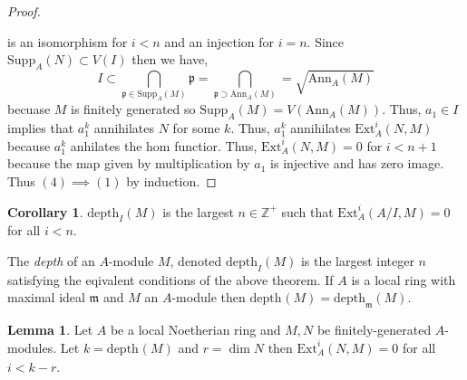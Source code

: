 \documentclass[12pt]{article}
\newcommand{\Z}{\mathbb{Z}}
\newcommand{\Ext}[4]{\mathrm{Ext}^{#1}_{#2} \left( #3, #4 \right)}
\newcommand{\Ann}[2]{\mathrm{Ann}_{#1}\left(#2\right)}
\newcommand{\supp}[2]{\mathrm{Supp}_{#1} \left( #2 \right) }
\newcommand{\Supp}[2]{\mathrm{Supp}_{#1}\left( #2 \right)}
\newcommand{\depth}[2]{\mathrm{depth}_{#1}\left(#2\right)}
\newcommand{\p}{\mathfrak{p}}
\newcommand{\m}{\mathfrak{m}}
\theoremstyle{remark}
\theoremstyle{definition}
\newtheorem{lemma}[theorem]{Lemma}
\newtheorem{corollary}[theorem]{Corollary}
\newenvironment{definition}[1][Definition:]{\begin{trivlist}
\item[\hskip \labelsep {\bfseries #1}]}{\end{trivlist}}
\begin{document}
\begin{proof}
\begin{center}
\end{center}
is an isomorphism for $i < n$ and an injection for $i = n$. 
Since $\supp{A}{N} \subset V(I)$ then we have,
\[ 
I \subset \bigcap_{\p \in \Supp{A}{M}} \p = \bigcap_{\p \supset \Ann{A}{M}} = \sqrt{\Ann{A}{M}} \]
becuase $M$ is finitely generated so $\Supp{A}{M} = V(\Ann{A}{M})$. 
Thus, $a_1 \in I$ implies that $a_1^k$ annihilates $N$ for some $k$. Thus, $a_1^k$ annihilates $\Ext{i}{A}{N}{M}$ because $a_1^k$ anhilates the hom functior. Thus, $\Ext{i}{A}{N}{M} = 0$ for $i < n + 1$ because the map given by multiplication by $a_1$ is injective and has zero image. Thus $(4) \implies (1)$ by induction.
\end{proof}

\begin{corollary}
$\depth{I}{M}$ is the largest $n \in \Z^{+}$ such that $\Ext{i}{A}{A/I}{M} = 0$ for all $i < n$. 
\end{corollary}


\begin{definition}
The \textit{depth} of an $A$-module $M$, denoted $\depth{I}{M}$ is the largest integer $n$ satisfying the eqivalent conditions of the above theorem. If $A$ is a local ring with maximal ideal $\m$ and $M$ an $A$-module then $\depth{}{M} = \depth{\m}{M}$. 
\end{definition}

\begin{lemma}
Let $A$ be a local Noetherian ring and $M,N$ be finitely-generated $A$-modules. Let $k = \depth{}{M}$ and $r = \dim{N}$ then $\Ext{i}{A}{N}{M} = 0$ for all $i < k - r$. 
\end{lemma}
\end{document}
